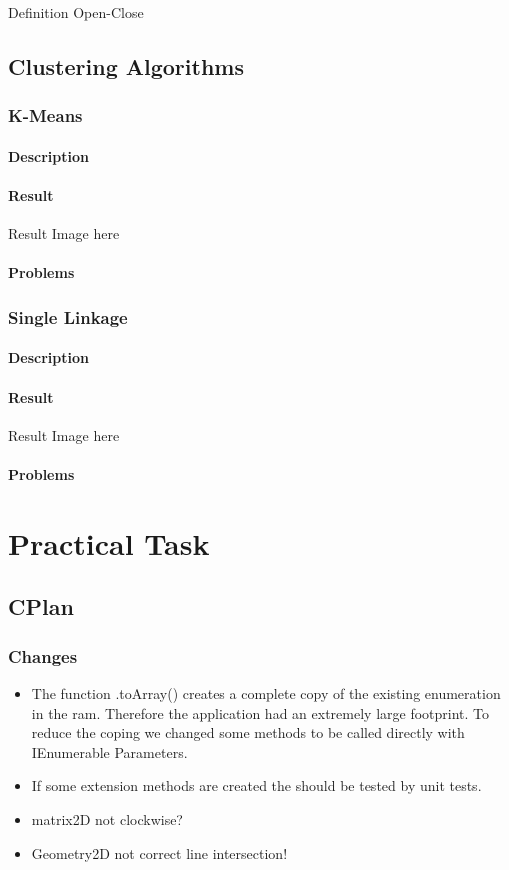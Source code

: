\documentclass[11pt, a4paper]{report}
\begin{document}
Definition Open-Close

\pagebreak
\section{Clustering Algorithms}
\subsection{K-Means}
\subsubsection{Description}

\subsubsection{Result}
Result Image here

\subsubsection{Problems}


\subsection{Single Linkage}
\subsubsection{Description}

\subsubsection{Result}
Result Image here

\subsubsection{Problems}

\pagebreak
\chapter{Practical Task}
\section{CPlan}
\subsection{Changes}
\begin{itemize}
    \item The function .toArray() creates a complete copy of the existing enumeration in the ram. Therefore the application had an extremely large footprint. To reduce the coping we changed some methods to be called directly with IEnumerable Parameters.
    \item If some extension methods are created the should be tested by unit tests.
    \item matrix2D not clockwise?
    \item Geometry2D not correct line intersection!
\end{itemize}
\end{document}
